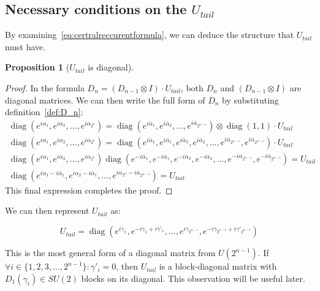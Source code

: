 \documentclass[a4paper, openany, 12pt]{article}
\newtheorem{prop}{Proposition}
\theoremstyle{remark}
\theoremstyle{definition}
\newcommand{\diag}{\operatorname{diag}}
\newcommand{\ot}{\otimes}
\begin{document}
\subsection{Necessary conditions on the $U_{tail}$ \label{sec:CNOTSCHEMEOUR}}

By examining~\eqref{eq:certralreccurentformula}, we can deduce the structure that $U_{tail}$ must have.

\begin{prop}[$U_{tail}$ is diagonal]
\label{prop:U_tail_is_diag}
\end{prop}
\begin{proof}
In the formula $D_n = (D_{n-1} \ot I)\cdot U_{tail}$, both $D_n$ and $(D_{n-1} \ot I)$ are diagonal matrices. We can then write the full form of $D_n$ by substituting definition~\ref{def:D_n}:
\begin{align}
    \diag(e^{i\alpha_1}, e^{i\alpha_2}, \dots, e^{i\alpha_{2^n}}) = \diag(e^{i\bar\alpha_1}, e^{i\bar\alpha_2}, \dots, e^{i\bar\alpha_{2^{n-1}}})\ot\diag(1,1) \cdot U_{tail} \\
    \diag(e^{i\alpha_1}, e^{i\alpha_2}, \dots, e^{i\alpha_{2^n}}) = \diag(e^{i\bar\alpha_1},e^{i\bar\alpha_1}, e^{i\bar\alpha_2},e^{i\bar\alpha_2}, \dots, e^{i\bar\alpha_{2^{n-1}}}, e^{i\bar\alpha_{2^{n-1}}}) \cdot U_{tail} \\
    \diag(e^{i\alpha_1}, e^{i\alpha_2}, \dots, e^{i\alpha_{2^n}})\diag(e^{-i\bar\alpha_1},e^{-i\bar\alpha_1}, e^{-i\bar\alpha_2},e^{-i\bar\alpha_2}, \dots, e^{-i\bar\alpha_{2^{n-1}}}, e^{-i\bar\alpha_{2^{n-1}}}) = U_{tail} \\
    \diag(e^{i\alpha_1-i\bar\alpha_1}, e^{i\alpha_2-i\bar\alpha_1}, \dots, e^{i\alpha_{2^n}-i\bar\alpha_{2^{n-1}}}) = U_{tail}
\end{align}
This final expression completes the proof.
\end{proof}


We can then represent $U_{tail}$ as:

\begin{equation}
    U_{tail} = \diag(e^{i\gamma_1}, e^{-i\gamma_1+i\gamma'_1}, \dots, e^{i\gamma_{2^{n-1}}}, e^{-i\gamma_{2^{n-1}}+i\gamma'_{2^{n-1}}})
    \label{eq:U_tail_general}
\end{equation}

This is the most general form of a diagonal matrix from $U(2^{n-1})$. If $\forall i \in \{1,2,3,\dots,2^{n-1}\}: \gamma'_i = 0$, then $U_{tail}$ is a block-diagonal matrix with $D_1(\gamma_i)\in SU(2)$ blocks on its diagonal. This observation will be useful later.
\end{document}
